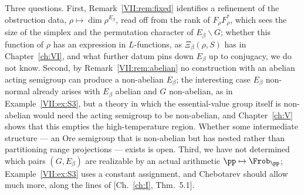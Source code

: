 Three questions. First, Remark~\ref{VII:rem:fixed} identifies a refinement of the
obstruction data, $\rho\mapsto\dim\rho^{E_\beta}$, read off from the rank of
$F_\rho F_\rho^*$, which sees the size of the simplex and the permutation character of
$E_\beta\backslash G$; whether this function of $\rho$ has an expression in $L$-functions,
as $\Xi_\beta(\rho,S)$ has in Chapter~\ref{ch:VI}, and what further datum pins down $E_\beta$ up to
conjugacy, we do not know.
Second, by
Remark~\ref{VII:rem:abelian} no construction with an abelian acting semigroup can produce a
non-abelian $E_\beta$; the interesting case $E_\beta$ non-normal already arises with
$E_\beta$ abelian and $G$ non-abelian, as in Example~\ref{VII:ex:S3}, but a theory in which the
essential-value group itself is non-abelian would need the acting semigroup to be
non-abelian, and Chapter~\ref{ch:V} shows that this empties the high-temperature region. Whether some intermediate structure --- an Ore semigroup that is non-abelian but has
nested rather than partitioning range projections --- exists is open. Third, we have not
determined which pairs $(G,E_\beta)$ are realizable by an actual arithmetic
$\pp\mapsto\Frob_\pp$; Example~\ref{VII:ex:S3} uses a constant assignment, and Chebotarev should
allow much more, along the lines of [Ch.~\ref{ch:I}, Thm.~5.1].

